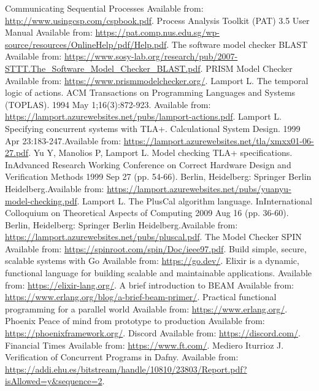 \begin{thebibliography}{9}
Communicating Sequential Processes
Available from: \url{http://www.usingcsp.com/cspbook.pdf}.
Process Analysis Toolkit (PAT) 3.5 User Manual
Available from: \url{https://pat.comp.nus.edu.sg/wp-source/resources/OnlineHelp/pdf/Help.pdf}.
The software model checker BLAST
Available from: \url{https://www.sosy-lab.org/research/pub/2007-STTT.The_Software_Model_Checker_BLAST.pdf}.
PRISM Model Checker
Available from: \url{https://www.prismmodelchecker.org/}.
Lamport L. The temporal logic of actions. ACM Transactions on Programming Languages and Systems (TOPLAS). 1994 May 1;16(3):872-923.
Available from: \url{https://lamport.azurewebsites.net/pubs/lamport-actions.pdf}.
Lamport L. Specifying concurrent systems with TLA+. Calculational System Design. 1999 Apr 23:183-247.Available from: \url{https://lamport.azurewebsites.net/tla/xmxx01-06-27.pdf}.
Yu Y, Manolios P, Lamport L. Model checking TLA+ specifications. InAdvanced Research Working Conference on Correct Hardware Design and Verification Methods 1999 Sep 27 (pp. 54-66). Berlin, Heidelberg: Springer Berlin Heidelberg.Available from: \url{https://lamport.azurewebsites.net/pubs/yuanyu-model-checking.pdf}.
Lamport L. The PlusCal algorithm language. InInternational Colloquium on Theoretical Aspects of Computing 2009 Aug 16 (pp. 36-60). Berlin, Heidelberg: Springer Berlin Heidelberg.Available from: \url{https://lamport.azurewebsites.net/pubs/pluscal.pdf}.
The Model Checker SPIN
Available from: \url{https://spinroot.com/spin/Doc/ieee97.pdf}.
Build simple, secure, scalable systems with Go
Available from: \url{https://go.dev/}.
Elixir is a dynamic, functional language for building scalable and maintainable applications.
Available from: \url{https://elixir-lang.org/}.
A brief introduction to BEAM
Available from: \url{https://www.erlang.org/blog/a-brief-beam-primer/}.
Practical functional programming for a parallel world
Available from: \url{https://www.erlang.org/}.
Phoenix Peace of mind from prototype to production
Available from: \url{https://phoenixframework.org/}.
Discord
Available from: \url{https://discord.com/}.
Financial Times
Available from: \url{https://www.ft.com/}.
Mediero Iturrioz J. Verification of Concurrent Programs in Dafny.
Available from: \url{https://addi.ehu.es/bitstream/handle/10810/23803/Report.pdf?isAllowed=y&sequence=2}.

\end{thebibliography}
